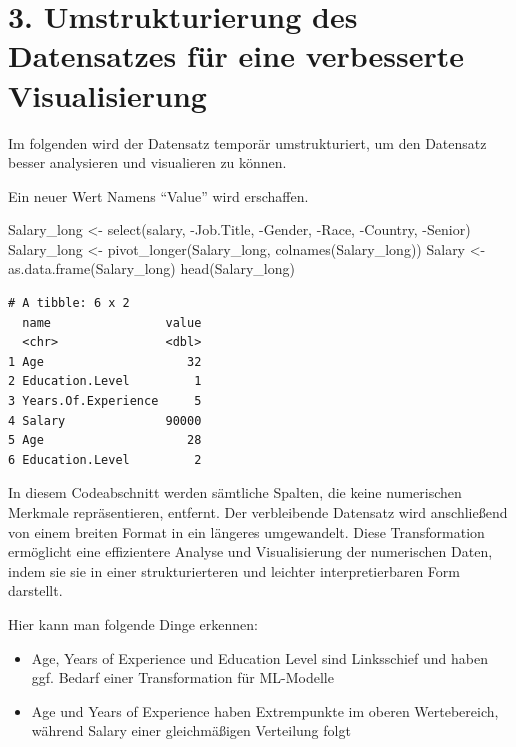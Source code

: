 \documentclass[
  letterpaper,
  DIV=11,
  numbers=noendperiod]{scrartcl}
\newenvironment{Shaded}{\begin{snugshade}}{\end{snugshade}}
\newcommand{\FunctionTok}[1]{\textcolor[rgb]{0.28,0.35,0.67}{#1}}
\newcommand{\NormalTok}[1]{\textcolor[rgb]{0.00,0.23,0.31}{#1}}
\newcommand{\OtherTok}[1]{\textcolor[rgb]{0.00,0.23,0.31}{#1}}
\newcommand{\SpecialCharTok}[1]{\textcolor[rgb]{0.37,0.37,0.37}{#1}}
\begin{document}
\hypertarget{umstrukturierung-des-datensatzes-fuxfcr-eine-verbesserte-visualisierung}{%
\section{3. Umstrukturierung des Datensatzes für eine verbesserte
Visualisierung}\label{umstrukturierung-des-datensatzes-fuxfcr-eine-verbesserte-visualisierung}}

Im folgenden wird der Datensatz temporär umstrukturiert, um den
Datensatz besser analysieren und visualieren zu können.

Ein neuer Wert Namens ``Value'' wird erschaffen.

\begin{Shaded}
\begin{Highlighting}[]
\NormalTok{Salary\_long }\OtherTok{\textless{}{-}} \FunctionTok{select}\NormalTok{(salary, }\SpecialCharTok{{-}}\NormalTok{Job.Title, }\SpecialCharTok{{-}}\NormalTok{Gender, }\SpecialCharTok{{-}}\NormalTok{Race, }\SpecialCharTok{{-}}\NormalTok{Country, }\SpecialCharTok{{-}}\NormalTok{Senior)}
\NormalTok{Salary\_long }\OtherTok{\textless{}{-}} \FunctionTok{pivot\_longer}\NormalTok{(Salary\_long, }\FunctionTok{colnames}\NormalTok{(Salary\_long))}
\NormalTok{Salary }\OtherTok{\textless{}{-}} \FunctionTok{as.data.frame}\NormalTok{(Salary\_long) }
\FunctionTok{head}\NormalTok{(Salary\_long)}
\end{Highlighting}
\end{Shaded}

\begin{verbatim}
# A tibble: 6 x 2
  name                value
  <chr>               <dbl>
1 Age                    32
2 Education.Level         1
3 Years.Of.Experience     5
4 Salary              90000
5 Age                    28
6 Education.Level         2
\end{verbatim}

In diesem Codeabschnitt werden sämtliche Spalten, die keine numerischen
Merkmale repräsentieren, entfernt. Der verbleibende Datensatz wird
anschließend von einem breiten Format in ein längeres umgewandelt. Diese
Transformation ermöglicht eine effizientere Analyse und Visualisierung
der numerischen Daten, indem sie sie in einer strukturierteren und
leichter interpretierbaren Form darstellt.

Hier kann man folgende Dinge erkennen:

\begin{itemize}
\item
  Age, Years of Experience und Education Level sind Linksschief und
  haben ggf. Bedarf einer Transformation für ML-Modelle
\item
  Age und Years of Experience haben Extrempunkte im oberen Wertebereich,
  während Salary einer gleichmäßigen Verteilung folgt
\end{itemize}
\end{document}
